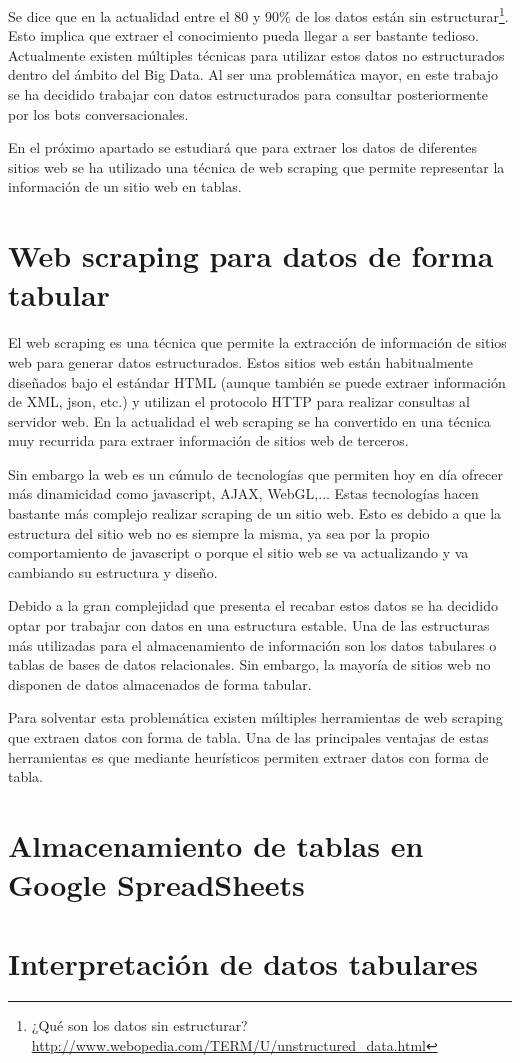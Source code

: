 Se dice que en la actualidad entre el 80 y 90\% de los datos están sin estructurar\footnote{¿Qué son los datos sin estructurar? \url{http://www.webopedia.com/TERM/U/unstructured_data.html}}. Esto implica que extraer el conocimiento pueda llegar a ser bastante tedioso. Actualmente existen múltiples técnicas para utilizar estos datos no estructurados dentro del ámbito del Big Data. Al ser una problemática mayor, en este trabajo se ha decidido trabajar con datos estructurados para consultar posteriormente por los bots conversacionales.

En el próximo apartado se estudiará que para extraer los datos de diferentes sitios web se ha utilizado una técnica de web scraping que permite representar la información de un sitio web en tablas.


\section{Web scraping para datos de forma tabular}

El web scraping es una técnica que permite la extracción de información de sitios web para generar datos estructurados. Estos sitios web están habitualmente diseñados bajo el estándar HTML (aunque también se puede extraer información de XML, json, etc.) y utilizan el protocolo HTTP para realizar consultas al servidor web. En la actualidad el web scraping se ha convertido en una técnica muy recurrida para extraer información de sitios web de terceros. 

Sin embargo la web es un cúmulo de tecnologías que permiten hoy en día ofrecer más dinamicidad como javascript, AJAX, WebGL,... Estas tecnologías hacen bastante más complejo realizar scraping de un sitio web. Esto es debido a que la estructura del sitio web no es siempre la misma, ya sea por la propio comportamiento de javascript o porque el sitio web se va actualizando y va cambiando su estructura y diseño.

Debido a la gran complejidad que presenta el recabar estos datos se ha decidido optar por trabajar con datos en una estructura estable. Una de las estructuras más utilizadas para el almacenamiento de información son los datos tabulares o tablas de bases de datos relacionales. Sin embargo, la mayoría de sitios web no disponen de datos almacenados de forma tabular.

Para solventar esta problemática existen múltiples herramientas de web scraping que extraen datos con forma de tabla. Una de las principales ventajas de estas herramientas es que mediante heurísticos permiten extraer datos con forma de tabla.

\section{Almacenamiento de tablas en Google SpreadSheets}


\section{Interpretación de datos tabulares}